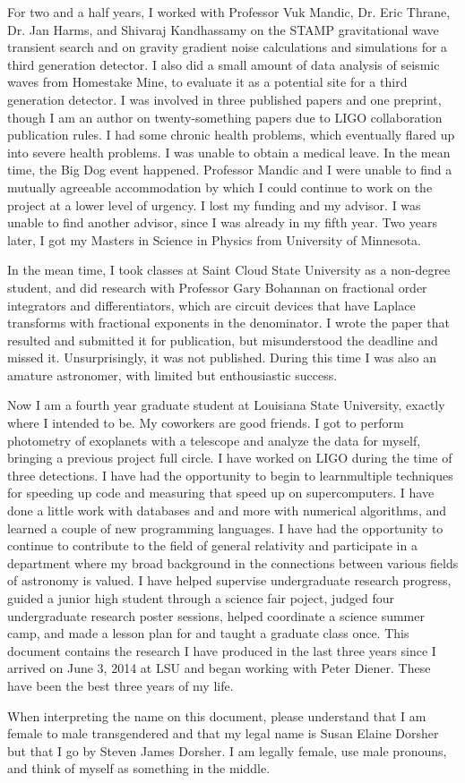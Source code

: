 \documentclass[12pt,letterpaper]{lsuetd}
\begin{document}
For two and a half years, I worked with Professor Vuk Mandic, Dr. Eric Thrane, Dr. Jan Harms, and Shivaraj Kandhassamy on the STAMP gravitational wave transient search and on gravity gradient noise calculations and simulations for a third generation detector. I also did a small amount of data analysis of seismic waves from Homestake Mine, to evaluate it as a potential site for a third generation detector. I was involved in three published papers and one preprint, though I am an author on twenty-something papers due to LIGO collaboration publication rules. I had some chronic health problems, which eventually flared up into severe health problems. I was unable to obtain a medical leave. In the mean time, the Big Dog event happened. Professor Mandic and I were unable to find a mutually agreeable accommodation by which I could continue to work on the project at a lower level of urgency. I lost my funding and my advisor. I was unable to find another advisor, since I was already in my fifth year. Two years later, I got my Masters in Science in Physics from University of Minnesota.

In the mean time, I took classes at Saint Cloud State University as a non-degree student, and did research with Professor Gary Bohannan on fractional order integrators and differentiators, which are circuit devices that have Laplace transforms with fractional exponents in the denominator. I wrote the paper that resulted and submitted it for publication, but misunderstood the deadline and missed it. Unsurprisingly, it was not published. During this time I was also an amature astronomer, with limited but enthousiastic success.

Now I am a fourth year graduate student at Louisiana State University, exactly where I intended to be. My coworkers are good friends. I got to perform photometry of exoplanets with a telescope and analyze the data for myself, bringing a previous project full circle. I have worked on LIGO during the time of three detections. I have had the opportunity to begin to learnmultiple techniques for speeding up code and measuring that speed up on supercomputers. I have done a little work with databases and and more with numerical algorithms, and learned a couple of new programming languages. I have had the opportunity to continue to contribute to the field of general relativity and participate in a department where my broad background in the connections between various fields of astronomy is valued. I have helped supervise undergraduate research progress, guided a junior high student through a science fair poject, judged four undergraduate research poster sessions, helped coordinate a science summer camp, and made a lesson plan for and taught a graduate class once. This document contains the research I have produced in the last three years since I arrived on June 3, 2014 at LSU and began working with Peter Diener. These have been the best three years of my life.

When interpreting the name on this document, please understand that I am female to male transgendered and that my legal name is Susan Elaine Dorsher but that I go by Steven James Dorsher. I am legally female, use male pronouns, and think of myself as something in the middle.
\end{document}
